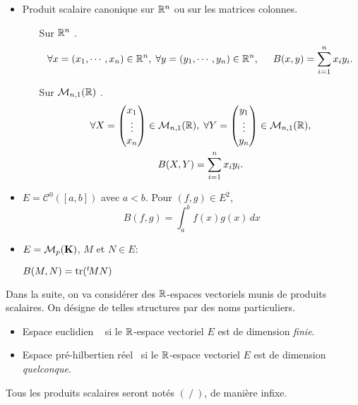 \begin{exples}
\begin{itemize}
\item Produit scalaire canonique sur $\mathbb{R}^n$ ou sur les matrices colonnes.
\begin{itemize}
  \item[Sur $\mathbb{R}^n$].
\[
  \forall x = (x_1, \cdots, x_n) \in \mathbb{R}^n,\;  \forall y = (y_1, \cdots, y_n) \in \mathbb{R}^n, \hspace{0.5cm}
  B(x,y) = \sum_{i=1}^{n}x_iy_i.
\]
  \item[Sur $\mathcal{M}_{n,1}(\mathbb{R})$].
\begin{multline*}
  \forall X = 
  \begin{pmatrix}
    x_1\\ \vdots \\ x_n
  \end{pmatrix}
 \in \mathcal{M}_{n,1}(\mathbb{R}),\;
   \forall Y = 
  \begin{pmatrix}
    y_1\\ \vdots \\ y_n
  \end{pmatrix}
 \in \mathcal{M}_{n,1}(\mathbb{R}), \\
 B(X,Y) = \sum_{i=1}^{n}x_iy_i.
\end{multline*}
\end{itemize}

\item $E = \mathcal{C}^{0}( [a,b] )$ avec $a < b$. Pour $(f,g) \in E^2$,
\begin{displaymath}
 B(f,g) = \int_{a}^{b} f(x) g(x) \,dx
\end{displaymath}
\item $E = \mathcal{M}_{p}(\mathbf{K})$, $M$ et $N \in E$:
\begin{center}
$B(M,N) = \mathrm{tr}( \mathstrut^t\! M N )$
\end{center}
\end{itemize}
\end{exples}
\newpage
Dans la suite, on va considérer des $\mathbb{R}$-espaces vectoriels munis de produits scalaires. On désigne de telles structures par des noms particuliers.
\begin{itemize}
\item \og Espace euclidien \fg~ si le $\mathbb{R}$-espace vectoriel $E$ est de dimension \emph{finie}.
\item \og Espace pré-hilbertien réel\fg~  si le $\mathbb{R}$-espace vectoriel $E$ est de dimension \emph{quelconque}.
\end{itemize}
\begin{nota}
Tous les produits scalaires seront notés $(~/~)$, de manière infixe.
\end{nota}

